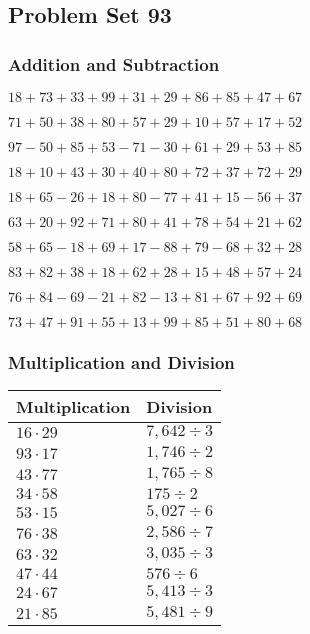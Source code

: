 \hypertarget{problem-set-93}{%
\subsection{Problem Set 93}\label{problem-set-93}}

\hypertarget{addition-and-subtraction}{%
\subsubsection{Addition and
Subtraction}\label{addition-and-subtraction}}

\(18+73+33+99+31+29+86+85+47+67\)

\(71+50+38+80+57+29+10+57+17+52\)

\(97-50+85+53-71-30+61+29+53+85\)

\(18+10+43+30+40+80+72+37+72+29\)

\(18+65-26+18+80-77+41+15-56+37\)

\(63+20+92+71+80+41+78+54+21+62\)

\(58+65-18+69+17-88+79-68+32+28\)

\(83+82+38+18+62+28+15+48+57+24\)

\(76+84-69-21+82-13+81+67+92+69\)

\(73+47+91+55+13+99+85+51+80+68\)

\hypertarget{multiplication-and-division}{%
\subsubsection{Multiplication and
Division}\label{multiplication-and-division}}

\begin{longtable}[]{@{}ll@{}}
\toprule
Multiplication & Division\tabularnewline
\midrule
\endhead
\(16\cdot29\) & \(7,642÷3\)\tabularnewline
\(93\cdot17\) & \(1,746÷2\)\tabularnewline
\(43\cdot77\) & \(1,765÷8\)\tabularnewline
\(34\cdot58\) & \(175÷2\)\tabularnewline
\(53\cdot15\) & \(5,027÷6\)\tabularnewline
\(76\cdot38\) & \(2,586÷7\)\tabularnewline
\(63\cdot32\) & \(3,035÷3\)\tabularnewline
\(47\cdot44\) & \(576÷6\)\tabularnewline
\(24\cdot67\) & \(5,413÷3\)\tabularnewline
\(21\cdot85\) & \(5,481÷9\)\tabularnewline
\bottomrule
\end{longtable}

